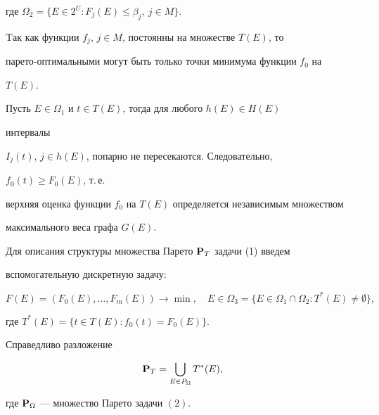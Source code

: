где $\Omega_2=\{E\in2^U:F_j(E)\le\beta_j,\ j\in M\}$. 


 


Tак как функции $f_j$, $j\in M$, постоянны на множестве $T(E)$, то 


парето-оптимальными могут быть только точки минимума функции $f_0$ на 


$T(E)$. 


 


Пусть $E\in\Omega_1$ и $t\in T(E)$, тогда для любого $h(E)\in H(E)$ 


интервалы 


$I_j(t)$, $j\in h(E)$, попарно не пересекаются. Следовательно, 


$f_0(t)\ge F_0(E)$, т.\,е. 


верхняя оценка функции $f_0$ на $T(E)$ определяется независимым множеством 


максимального веса графа $G(E)$. 


 


Для описания структуры множества Парето $\bold P_T$ задачи (1) введем 


вспомогательную дискретную задачу: 


\begin{equation} 


F(E)=(F_0(E),\dotsc,F_m(E))\to\min,\quad 


E\in\Omega_3=\{E\in\Omega_1\cap\Omega_2:T^*(E)\ne\emptyset\}, 


\end{equation} 


где $T^*(E)=\{t\in T(E):f_0(t)=F_0(E)\}$. 


 


\begin{thm} 


Справедливо разложение 


\begin{equation} 


\bold P_T=\bigcup_{E\in P_\Omega}T^*(E), 


\end{equation} 


где $\bold P_\Omega$ --- множество Парето задачи $(2)$. 


\end{thm} 


 


